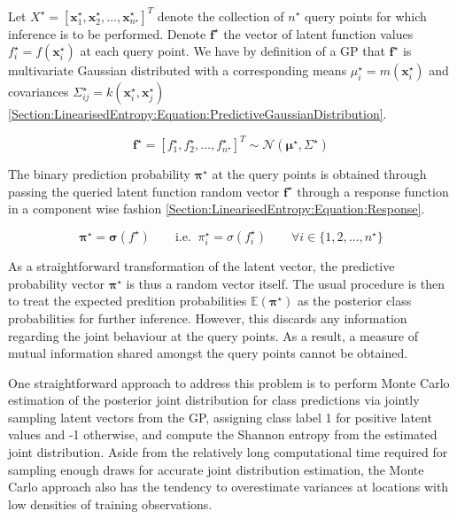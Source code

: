 \documentclass{article}
\renewcommand{\vec}[1]{\boldsymbol{#1}}
\begin{document}
		Let $X^{\star} = [ \vec{x}^{\star}_{1}, \vec{x}^{\star}_{2}, \dots, \vec{x}^{\star}_{n^{\star}}]^{T}$ denote the collection of $n^{\star}$ query points for which inference is to be performed. Denote $\vec{f}^{\star}$ the vector of latent function values $f^{\star}_{i} = f(\vec{x}^{\star}_{i})$ at each query point. We have by definition of a GP that $\vec{f}^{\star}$ is multivariate Gaussian distributed with a corresponding means $\mu^{\star}_{i} = m(\vec{x}^{\star}_{i})$ and covariances $\Sigma^{\star}_{ij} = k(\vec{x}^{\star}_{i}, \vec{x}^{\star}_{j})$ \eqref{Section:LinearisedEntropy:Equation:PredictiveGaussianDistribution}.
		
		\begin{equation}
			\vec{f}^{\star} = [f^{\star}_{1}, f^{\star}_{2}, \dots, f^{\star}_{n^{\star}}]^{T} \sim \mathcal{N}(\vec{\mu}^{\star}, \Sigma^{\star})
		\label{Section:LinearisedEntropy:Equation:PredictiveGaussianDistribution}
		\end{equation}
			
		The binary prediction probability $\vec{\pi^{\star}}$ at the query points is obtained through passing the queried latent function random vector $\vec{f}^{\star}$ through a response function in a component wise fashion \eqref{Section:LinearisedEntropy:Equation:Response}.
		
		\begin{equation}
			\vec{\pi}^{\star} = \vec{\sigma}(f^{\star})\mathrm{ \qquad i.e. \;\;}\pi^{\star}_{i} = \sigma(f^{\star}_{i}) \qquad \forall i \in \{1, 2, \dots, n^{\star}\}
		\label{Section:LinearisedEntropy:Equation:Response}
		\end{equation}
		
		As a straightforward transformation of the latent vector, the predictive probability vector $\vec{\pi^{\star}}$ is thus a random vector itself. The usual procedure is then to treat the expected predition probabilities $\mathbb{E}(\vec{\pi^{\star}})$ as the posterior class probabilities for further inference. However, this discards any information regarding the joint behaviour at the query points. As a result, a measure of mutual information shared amongst the query points cannot be obtained.
		
		One straightforward approach to address this problem is to perform Monte Carlo estimation of the posterior joint distribution for class predictions via jointly sampling latent vectors from the GP, assigning class label 1 for positive latent values and -1 otherwise, and compute the Shannon entropy \cite{ShannonEntropy} from the estimated joint distribution. Aside from the relatively long computational time required for sampling enough draws for accurate joint distribution estimation, the Monte Carlo approach also has the tendency to overestimate variances at locations with low densities of training observations.
				
\end{document}
